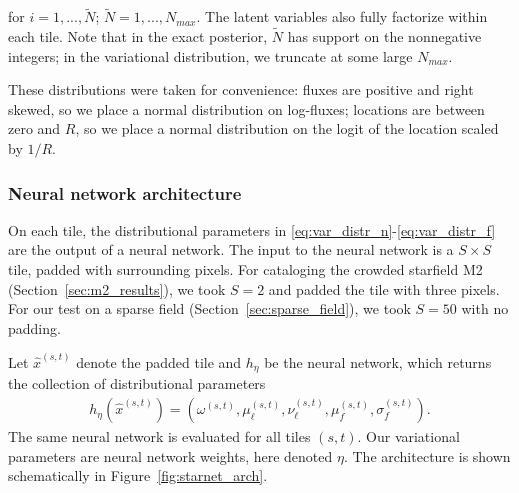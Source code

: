 for $i = 1, ..., \tilde N$; $\tilde N = 1, ..., N_{max}$. The latent variables also fully factorize within each tile. Note that in the exact posterior, $\tilde N$ has support on the nonnegative integers; in the variational distribution, we truncate at some large $N_{max}$. 


These distributions were taken for convenience: fluxes are positive and right skewed, so we place a normal distribution on log-fluxes; locations are between zero and $R$, so 
we place a normal distribution on the logit of the location scaled by $1 / R$. 

\subsubsection{Neural network architecture}
\label{sec:nn_archetecture}
On each tile, the distributional parameters 
in \eqref{eq:var_distr_n}-\eqref{eq:var_distr_f} are the output of a neural network.
The input to the neural network is a $S \times S$ tile, padded with surrounding pixels.
For cataloging the crowded starfield M2 (Section~\ref{sec:m2_results}),
we took $S = 2$ and padded the tile with three pixels. 
For our test on a sparse field (Section~\ref{sec:sparse_field}), we took $S = 50$ with no padding. 

Let $\hat x^{(s,t)}$ denote the padded tile and $h_\eta$ be the neural network, which returns the collection of distributional parameters
\begin{align}
    h_\eta(\hat x^{(s,t)}) = (\omega^{(s,t)}, \mu_\ell^{(s,t)}, \nu_{\ell}^{(s,t)}, \mu_f^{(s,t)}, \sigma^{(s,t)}_f).
    \label{eq:nn_output}
\end{align}
The same neural network is evaluated for all tiles $(s,t)$. Our variational parameters are neural network weights, here denoted $\eta$. 
The architecture is shown schematically in Figure~\ref{fig:starnet_arch}. 

